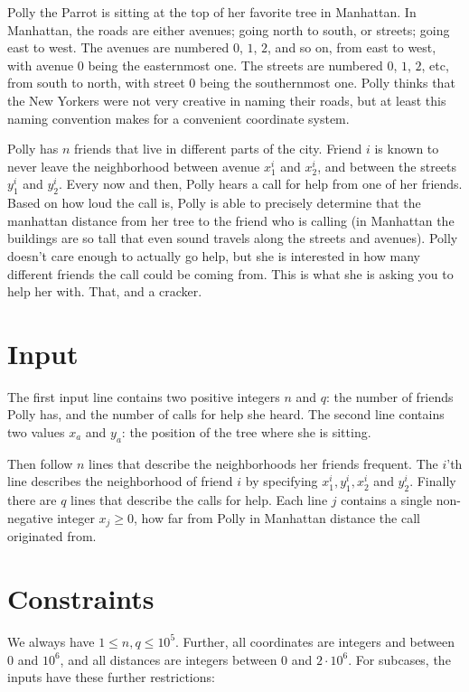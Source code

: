 
\noindent
Polly the Parrot is sitting at the top of her favorite tree in Manhattan. In Manhattan, the roads are either avenues; going north to south, or streets; going east to west. The avenues are numbered $0$, $1$, $2$, and so on, from east to west, with avenue $0$ being the easternmost one. The streets are numbered  $0$, $1$, $2$, etc, from south to north, with street $0$ being the southernmost one. Polly thinks that the New Yorkers were not very creative in naming their roads, but at least this naming convention makes for a convenient coordinate system. 

Polly has $n$ friends that live in different parts of the city. Friend $i$ is known to never leave the neighborhood between avenue $x_1^i$ and $x_2^i$, and between the streets $y_1^i$ and $y_2^i$. Every now and then, Polly hears a call for help from one of her friends. Based on how loud the call is, Polly is able to precisely determine that the manhattan distance from her tree to the friend who is calling (in Manhattan the buildings are so tall that even sound travels along the streets and avenues). Polly doesn't care enough to actually go help, but she is interested in how many different friends the call could be coming from. This is what she is asking you to help her with. That, and a cracker. 

\section*{Input}
The first input line contains two positive integers $n$ and $q$: the number of friends Polly has, and the number of calls for help she heard. The second line contains two values $x_a$ and $y_a$: the position of the tree where she is sitting.

Then follow $n$ lines that describe the neighborhoods her friends frequent. The $i$'th line describes the neighborhood of friend $i$ by specifying $x_1^i, y_1^i, x_2^i$ and $y_2^i$. Finally there are $q$ lines that describe the calls for help. Each line $j$ contains a single non-negative integer $x_j \geq 0$, how far from Polly in Manhattan distance the call originated from. 

\section*{Constraints}
We always have $1 \leq n, q \leq 10^5$. Further, all coordinates are integers and between $0$ and $10^6$, and all distances are integers between $0$ and $2\cdot 10^6$.  For subcases, the inputs have these further restrictions:

